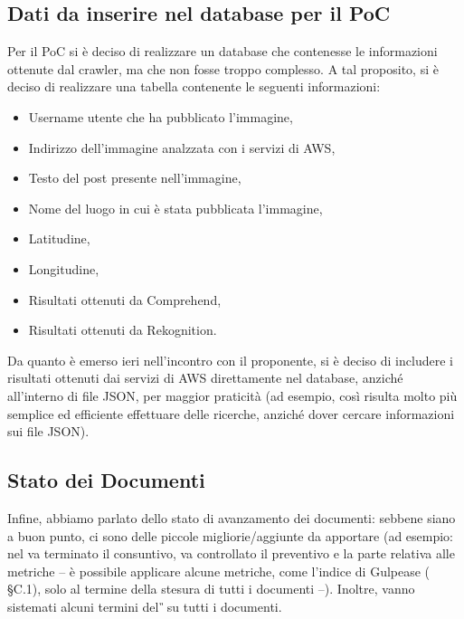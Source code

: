 \subsection{Dati da inserire nel database per il PoC}

Per il PoC si è deciso di realizzare un database che contenesse le informazioni ottenute dal crawler, ma che non fosse troppo complesso. A tal proposito, si è deciso di realizzare una tabella contenente le seguenti informazioni:

\begin{itemize}
\item Username utente che ha pubblicato l'immagine,
\item Indirizzo dell'immagine analzzata con i servizi di AWS,
\item Testo del post presente nell'immagine,
\item Nome del luogo in cui è stata pubblicata l'immagine,
\item Latitudine,
\item Longitudine,
\item Risultati ottenuti da Comprehend,
\item Risultati ottenuti da Rekognition.
\end{itemize}

Da quanto è emerso ieri nell'incontro con il proponente, si è deciso di includere i risultati ottenuti dai servizi di AWS direttamente nel database, anziché all'interno di file JSON, per maggior praticità (ad esempio, così risulta molto più semplice ed efficiente effettuare delle ricerche, anziché dover cercare informazioni sui file JSON).

\subsection{Stato dei Documenti}

Infine, abbiamo parlato dello stato di avanzamento dei documenti: sebbene siano a buon punto, ci sono delle piccole migliorie/aggiunte da apportare (ad esempio: nel \textit{\PdQ} va terminato il consuntivo, va controllato il preventivo e la parte relativa alle metriche – è possibile applicare alcune metriche, come l'indice di Gulpease (\textit{\NdP} \S{}C.1), solo al termine della stesura di tutti i documenti –). Inoltre, vanno sistemati alcuni termini del \textit{\G} su tutti i documenti.
